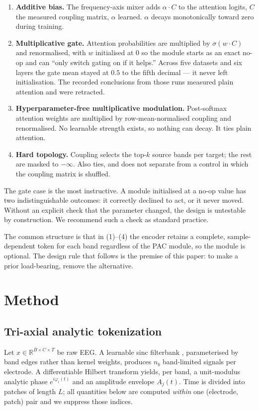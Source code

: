 \documentclass{article}
\begin{document}
\begin{enumerate}
\item \textbf{Additive bias.} The frequency-axis mixer adds
$\alpha \cdot C$ to the attention logits, $C$ the measured coupling matrix,
$\alpha$ learned. $\alpha$ decays monotonically toward zero during training.
\item \textbf{Multiplicative gate.} Attention probabilities are multiplied by
$\sigma(w \cdot C)$ and renormalised, with $w$ initialised at $0$ so the module
starts as an exact no-op and can ``only switch gating on if it helps.'' Across
five datasets and six layers the gate mean stayed at $0.5$ to the fifth decimal
--- it never left initialisation. The recorded conclusions from those runs
measured plain attention and were retracted.
\item \textbf{Hyperparameter-free multiplicative modulation.} Post-softmax
attention weights are multiplied by row-mean-normalised coupling and
renormalised. No learnable strength exists, so nothing can decay. It ties plain
attention.
\item \textbf{Hard topology.} Coupling selects the top-$k$ source bands per
target; the rest are masked to $-\infty$. Also ties, and does not separate from a
control in which the coupling matrix is shuffled.
\end{enumerate}

The gate case is the most instructive. A module initialised at a no-op value has
two indistinguishable outcomes: it correctly declined to act, or it never moved.
Without an explicit check that the parameter changed, the design is untestable by
construction. We recommend such a check as standard practice.

The common structure is that in (1)--(4) the encoder retains a complete,
sample-dependent token for each band regardless of the PAC module, so the module
is optional. The design rule that follows is the premise of this paper: to make a
prior load-bearing, remove the alternative.

\section{Method}
\label{sec:method}

\subsection{Tri-axial analytic tokenization}

Let $x \in \mathbb{R}^{B\times C\times T}$ be raw EEG. A learnable sinc
filterbank \citep{ravanelli2018sincnet}, parameterised by band edges rather than
kernel weights, produces $n_b$ band-limited signals per electrode. A
differentiable Hilbert transform yields, per band, a unit-modulus analytic phase
$e^{i\varphi_i(t)}$ and an amplitude envelope $A_j(t)$. Time is divided into
patches of length $L$; all quantities below are computed \emph{within} one
(electrode, patch) pair and we suppress those indices.
\end{document}
